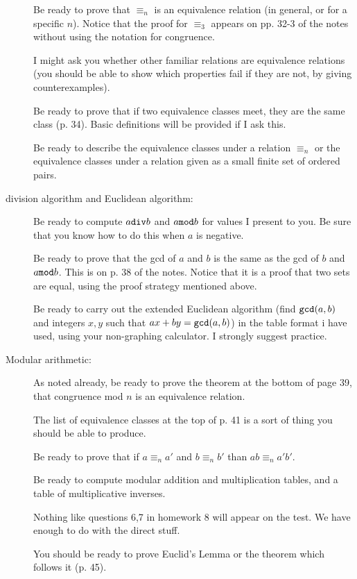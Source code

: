 \documentclass[12pt]{article}
\begin{document}
\begin{description}
Be ready to prove that $\equiv_n$ is an equivalence relation (in general, or for a specific $n$).  Notice that the proof for $\equiv_3$ appears on pp. 32-3 of the notes without using the notation for congruence.

I might ask you whether other familiar relations are equivalence relations (you should be able to show which properties fail if they are not, by giving counterexamples).

Be ready to prove that if two equivalence classes meet, they are the same class (p. 34).  Basic definitions will be provided if I ask this.

Be ready to describe the equivalence classes under a relation $\equiv_n$ or the equivalence classes under a relation given as a small finite set of ordered pairs.

\item[division algorithm and Euclidean algorithm:]

Be ready to compute $a {\tt div} b$ and $a {\tt mod} b$ for values I present to you.  Be sure that you know how to do this when $a$ is negative.

Be ready to prove that the gcd of $a$ and $b$ is the same as the gcd of $b$ and $a {\tt mod} b$.  This is on p.  38 of the notes.  Notice that it is a proof that two sets are equal, using the proof strategy mentioned above.

Be ready to carry out the extended Euclidean algorithm (find ${\tt gcd}(a,b)$ and integers $x, y$ such that
$ax+by = {\tt gcd}(a,b)$) in the table format i have used, using your non-graphing calculator.  I strongly suggest practice.

\item[Modular arithmetic:]

As noted already, be ready to prove the theorem at the bottom of page 39, that congruence mod $n$ is an equivalence relation.

The list of equivalence classes at the top of p. 41 is a sort of thing you should be able to produce.

Be ready to prove that if $a \equiv_n a'$ and $b \equiv_n b'$ than $ab \equiv_n a'b'$.

Be ready to compute modular addition and multiplication tables, and a table of multiplicative inverses.

Nothing like questions 6,7 in homework 8 will appear on the test.  We have enough to do with the direct stuff.

You should be ready to prove Euclid's Lemma or the theorem which follows it (p. 45).


\end{description}
\end{document}
